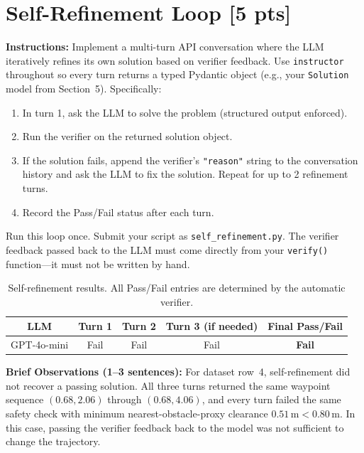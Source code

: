\documentclass[12pt]{article}
\begin{document}
\newpage
\section{Self-Refinement Loop [5 pts]}

\noindent\textbf{Instructions:} Implement a multi-turn API conversation where the LLM
iteratively refines its own solution based on verifier feedback. Use \texttt{instructor}
throughout so every turn returns a typed Pydantic object (e.g., your \texttt{Solution} model
from Section~5). Specifically:
\begin{enumerate}
  \item In turn 1, ask the LLM to solve the problem (structured output enforced).
  \item Run the verifier on the returned solution object.
  \item If the solution fails, append the verifier's \texttt{"reason"} string to the conversation
    history and ask the LLM to fix the solution. Repeat for up to 2 refinement turns.
  \item Record the Pass/Fail status after each turn.
\end{enumerate}
Run this loop once. Submit your script as \texttt{self\_refinement.py}. The verifier feedback
passed back to the LLM must come directly from your \texttt{verify()} function---it must not be
written by hand.



\begin{table}[H]
  \centering
  \begin{tabular}{ccccc}
    \toprule
    \textbf{LLM} & \textbf{Turn 1} & \textbf{Turn 2} & \textbf{Turn 3 (if needed)} &
    \textbf{Final Pass/Fail} \\
    \midrule
    GPT-4o-mini & Fail & Fail & Fail & \textbf{Fail} \\
    \bottomrule
  \end{tabular}
  \caption{Self-refinement results. All Pass/Fail entries are determined by the automatic
  verifier.}
  \label{tab:self_refinement}
\end{table}

\medskip
\noindent\textbf{Brief Observations (1--3 sentences):} For dataset row~4, self-refinement did
not recover a passing solution. All three turns returned the same waypoint sequence
$(0.68, 2.06)$ through $(0.68, 4.06)$, and every turn failed the same safety check with minimum
nearest-obstacle-proxy clearance $0.51\,\text{m} < 0.80\,\text{m}$. In this case, passing the
verifier feedback back to the model was not sufficient to change the trajectory.
\end{document}
